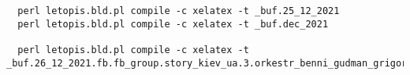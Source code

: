  
 
 
 
 

\begin{verbatim}
  perl letopis.bld.pl compile -c xelatex -t _buf.25_12_2021
  perl letopis.bld.pl compile -c xelatex -t _buf.dec_2021

  perl letopis.bld.pl compile -c xelatex -t _buf.26_12_2021.fb.fb_group.story_kiev_ua.3.orkestr_benni_gudman_grigorij_chapkis_1962

\end{verbatim}
